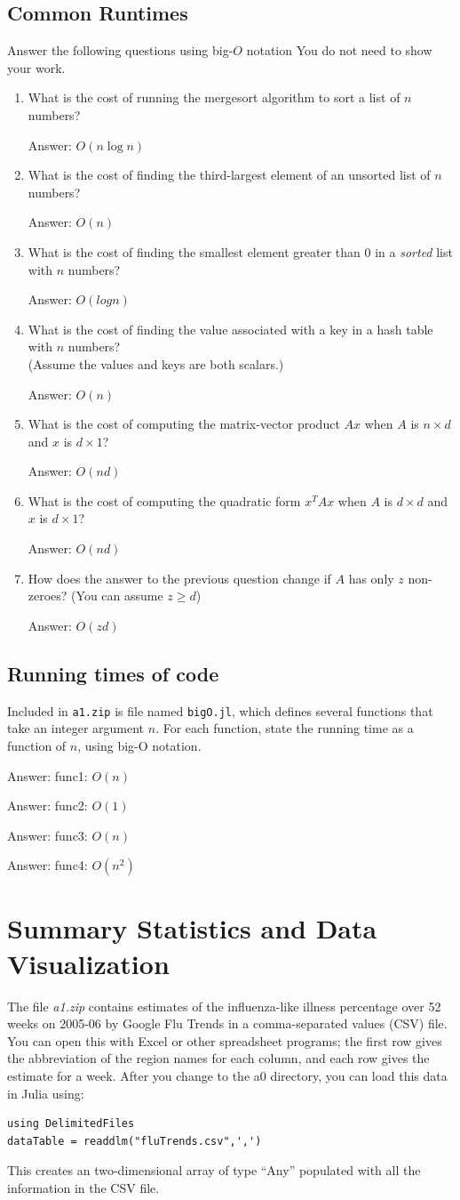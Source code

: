 \documentclass{article}
\def\ans#1{\par\gre{Answer: #1}}
\def\blu#1{{\color{blu}#1}}
\def\gre#1{{\color{gre}#1}}
\begin{document}
\subsection{Common Runtimes}

\blu{Answer the following questions using big-$O$ notation} You do not need to show your work.
\begin{enumerate}
\item What is the cost of running the mergesort algorithm to sort  a list of $n$ numbers?
\ans{$O(n\log n)$}
\item What is the cost of finding the third-largest element of an unsorted list of $n$ numbers?
\ans{$O(n)$}
\item What is the cost of finding the smallest element greater than 0 in a \emph{sorted} list with $n$ numbers?
\ans{$O(log n)$}
\item What is the cost of finding the value associated with a key in a hash table with $n$ numbers? \\(Assume the values and keys are both scalars.)
\ans{$O(n)$}
\item What is the cost of computing the matrix-vector product $Ax$ when $A$ is $n \times d$ and $x$ is $d \times 1$?
\ans{$O(nd)$}
\item What is the cost of computing the quadratic form $x^TAx$ when $A$ is $d \times d$ and $x$ is $d \times 1$?
\ans{$O(nd)$}
\item How does the answer to the previous question change if $A$ has only $z$ non-zeroes? (You can assume $z \geq d$)
\ans{$O(zd)$}
\end{enumerate}

\subsection{Running times of code}

Included in \texttt{a1.zip} is file named \texttt{bigO.jl}, which defines several functions
that take an integer argument $n$. For each function, \blu{state the running time as a function of $n$, using big-O notation}.
\ans{func1: $O(n)$}
\ans{func2: $O(1)$}
\ans{func3: $O(n)$}
\ans{func4: $O(n^2)$}


\section{Summary Statistics and Data Visualization}

The file \emph{a1.zip} contains estimates of the influenza-like illness percentage over 52 weeks on 2005-06 by Google Flu Trends in a comma-separated values (CSV) file. You can open this with Excel or other spreadsheet programs; the first row gives the abbreviation of the region names for each column, and each row gives the estimate for a week.
After you change to the a0 directory, you can load this data in Julia using:
\begin{verbatim}
using DelimitedFiles
dataTable = readdlm("fluTrends.csv",',')
\end{verbatim}
This creates an two-dimensional array of type ``Any''  populated with all the information in the CSV file.
\end{document}
